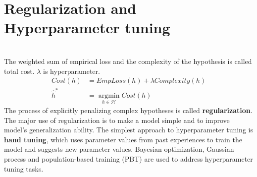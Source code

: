 \documentclass{article}
\begin{document}
\section{Regularization and Hyperparameter tuning}
\begin{paragraph}
\\
The weighted sum of empirical loss and the complexity of the hypothesis is called total cost. $\lambda$ is hyperparameter.
\begin{align*}
    Cost(h) & = EmpLoss(h) + \lambda Complexity(h) \\
    \hat{h}^* & = \operatorname*{argmin}_{h\in\mathcal{H}} Cost(h)
\end{align*}
The process of explicitly penalizing complex hypotheses is called \textbf{regularization}. The major use of regularization is to make a model simple and to improve model's generalization ability. The simplest approach to hyperparameter tuning is \textbf{hand tuning}, which uses parameter values from past experiences to train the model and suggests new parameter values. Bayesian optimization, Gaussian process and population-based training (PBT) are used to address hyperparameter tuning tasks.
\end{paragraph}
\end{document}
